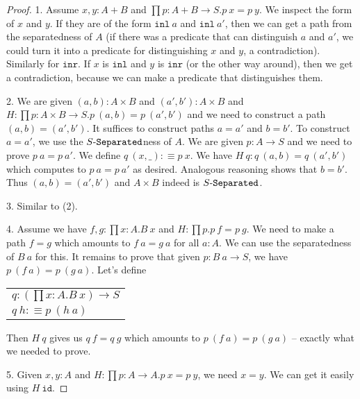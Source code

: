 \documentclass[11pt]{article}
\theoremstyle{definition}
\newcommand{\txt}[1]{\texttt{#1}}
\newcommand{\text}[1]{\texttt{#1}}
\renewcommand{\(}{\left(}
\renewcommand{\)}{\right)}
\newcommand{\defn}{:\equiv}
\newcommand{\apl}[2]{#1\ #2}
\newcommand{\id}{\text{id}}
\newcommand{\dprod}[2]{\prod #1.#2}
\newcommand{\prodt}[2]{#1 \times #2}
\newcommand{\inl}{\txt{inl}}
\newcommand{\inr}{\txt{inr}}
\begin{document}
\begin{proof}
1. Assume $x, y : A + B$ and $\dprod{p : A + B \to S}{\apl{p}{x} = \apl{p}{y}}$. We inspect the form of $x$ and $y$. If they are of the form $\apl{\inl}{a}$ and $\apl{\inl}{a'}$, then we can get a path from the separatedness of $A$ (if there was a predicate that can distinguish $a$ and $a'$, we could turn it into a predicate for distinguishing $x$ and $y$, a contradiction). Similarly for $\inr$. If $x$ is $\inl$ and $y$ is $\inr$ (or the other way around), then we get a contradiction, because we can make a predicate that distinguishes them.

2. We are given $(a, b) : \prodt{A}{B}$ and $(a', b') : \prodt{A}{B}$ and $H : \dprod{p : \prodt{A}{B} \to S}{\apl{p}{(a, b)} = \apl{p}{(a', b')}}$ and we need to construct a path $(a, b) = (a', b')$. It suffices to construct paths $a = a'$ and $b = b'$. To construct $a = a'$, we use the $\Separated{S}$ness of $A$. We are given $p : A \to S$ and we need to prove $\apl{p}{a} = \apl{p}{a'}$. We define $\apl{q}{(x, \_)} \defn \apl{p}{x}$. We have $\apl{H}{q} : \apl{q}{(a, b)} = \apl{q}{(a', b')}$ which computes to $\apl{p}{a} = \apl{p}{a'}$ as desired. Analogous reasoning shows that $b = b'$. Thus $(a, b) = (a', b')$ and $\prodt{A}{B}$ indeed is $\Separated{S}$.

3. Similar to (2).

4. Assume we have $f, g : \dprod{x : A}{\apl{B}{x}}$ and $H : \dprod{p}{\apl{p}{f} = \apl{p}{g}}$. We need to make a path $f = g$ which amounts to $\apl{f}{a} = \apl{g}{a}$ for all $a : A$. We can use the separatedness of $\apl{B}{a}$ for this. It remains to prove that given $p : \apl{B}{a} \to S$, we have $\apl{p}{(\apl{f}{a})} = \apl{p}{(\apl{g}{a})}$. Let's define \\

\begin{center}
\begin{tabular}{l}
$q : \(\dprod{x : A}{\apl{B}{x}}\) \to S$ \\
$\apl{q}{h} \defn \apl{p}{(\apl{h}{a})}$
\end{tabular}
\end{center}

Then $\apl{H}{q}$ gives us $\apl{q}{f} = \apl{q}{g}$ which amounts to $\apl{p}{(\apl{f}{a})} = \apl{p}{(\apl{g}{a})}$ -- exactly what we needed to prove.

5. Given $x, y : A$ and $H : \dprod{p : A \to A}{\apl{p}{x} = \apl{p}{y}}$, we need $x = y$. We can get it easily using $\apl{H}{\id}$.
\end{proof}
\end{document}

